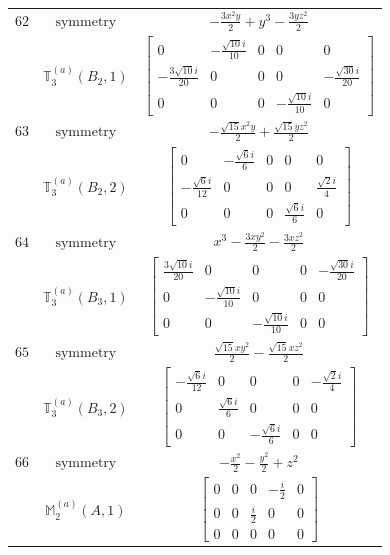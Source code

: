 \documentclass[fleqn,8pt,landscape]{jsarticle}
\begin{document}
\begin{longtable}{ccc}
$ 62 $ & $ \text{symmetry} $ & $ - \frac{3 x^{2} y}{2} + y^{3} - \frac{3 y z^{2}}{2} $ \\
$  $ & $ \mathbb{T}_{3}^{(a)}(B_{2},1) $ & $ \begin{bmatrix} 0 & - \frac{\sqrt{10} i}{10} & 0 & 0 & 0 \\ - \frac{3 \sqrt{10} i}{20} & 0 & 0 & 0 & - \frac{\sqrt{30} i}{20} \\ 0 & 0 & 0 & - \frac{\sqrt{10} i}{10} & 0 \end{bmatrix} $ \\ \hline
$ 63 $ & $ \text{symmetry} $ & $ - \frac{\sqrt{15} x^{2} y}{2} + \frac{\sqrt{15} y z^{2}}{2} $ \\
$  $ & $ \mathbb{T}_{3}^{(a)}(B_{2},2) $ & $ \begin{bmatrix} 0 & - \frac{\sqrt{6} i}{6} & 0 & 0 & 0 \\ - \frac{\sqrt{6} i}{12} & 0 & 0 & 0 & \frac{\sqrt{2} i}{4} \\ 0 & 0 & 0 & \frac{\sqrt{6} i}{6} & 0 \end{bmatrix} $ \\ \hline
$ 64 $ & $ \text{symmetry} $ & $ x^{3} - \frac{3 x y^{2}}{2} - \frac{3 x z^{2}}{2} $ \\
$  $ & $ \mathbb{T}_{3}^{(a)}(B_{3},1) $ & $ \begin{bmatrix} \frac{3 \sqrt{10} i}{20} & 0 & 0 & 0 & - \frac{\sqrt{30} i}{20} \\ 0 & - \frac{\sqrt{10} i}{10} & 0 & 0 & 0 \\ 0 & 0 & - \frac{\sqrt{10} i}{10} & 0 & 0 \end{bmatrix} $ \\ \hline
$ 65 $ & $ \text{symmetry} $ & $ \frac{\sqrt{15} x y^{2}}{2} - \frac{\sqrt{15} x z^{2}}{2} $ \\
$  $ & $ \mathbb{T}_{3}^{(a)}(B_{3},2) $ & $ \begin{bmatrix} - \frac{\sqrt{6} i}{12} & 0 & 0 & 0 & - \frac{\sqrt{2} i}{4} \\ 0 & \frac{\sqrt{6} i}{6} & 0 & 0 & 0 \\ 0 & 0 & - \frac{\sqrt{6} i}{6} & 0 & 0 \end{bmatrix} $ \\ \hline
$ 66 $ & $ \text{symmetry} $ & $ - \frac{x^{2}}{2} - \frac{y^{2}}{2} + z^{2} $ \\
$  $ & $ \mathbb{M}_{2}^{(a)}(A,1) $ & $ \begin{bmatrix} 0 & 0 & 0 & - \frac{i}{2} & 0 \\ 0 & 0 & \frac{i}{2} & 0 & 0 \\ 0 & 0 & 0 & 0 & 0 \end{bmatrix} $ \\ \hline

\end{longtable}
\end{document}
